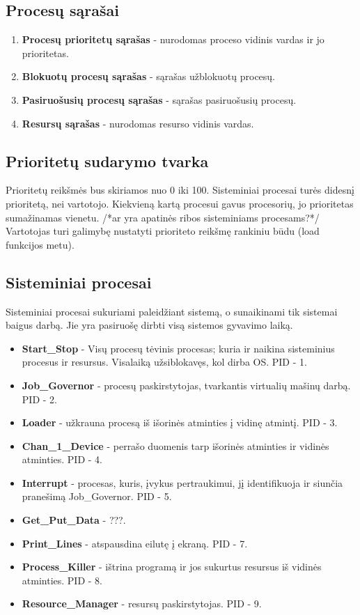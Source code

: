 	\subsection{Procesų sąrašai}
		\begin{enumerate}
			\item \textbf{Procesų prioritetų sąrašas} - nurodomas proceso vidinis vardas ir jo prioritetas.
			\item \textbf{Blokuotų procesų sąrašas} - sąrašas užblokuotų procesų.
			\item \textbf{Pasiruošusių procesų sąrašas} - sąrašas pasiruošusių procesų.
			\item  \textbf{Resursų sąrašas} - nurodomas resurso vidinis vardas.
		\end{enumerate}
	\subsection{Prioritetų sudarymo tvarka}
		Prioritetų reikšmės bus skiriamos nuo 0 iki 100. Sisteminiai procesai turės didesnį prioritetą, nei vartotojo. Kiekvieną kartą procesui gavus procesorių, jo prioritetas sumažinamas vienetu. /*ar yra apatinės ribos sisteminiams procesams?*/ Vartotojas turi galimybę nustatyti prioriteto reikšmę rankiniu būdu (load funkcijos metu).
	\subsection{Sisteminiai procesai}
		Sisteminiai procesai sukuriami paleidžiant sistemą, o sunaikinami tik sistemai baigus darbą. Jie yra pasiruošę dirbti visą sistemos gyvavimo laiką. 
		\begin{itemize}
			\item \textbf{Start\_Stop} - Visų procesų tėvinis procesas; kuria ir naikina sisteminius procesus ir resursus. Visalaiką užsiblokavęs, kol dirba OS. PID - 1.
			\item \textbf{Job\_Governor} - procesų paskirstytojas, tvarkantis virtualių mašinų darbą. PID - 2.
			\item \textbf{Loader} - užkrauna procesą iš išorinės atminties į vidinę atmintį. PID - 3.
			\item \textbf{Chan\_1\_Device} - perrašo duomenis tarp išorinės atminties ir vidinės atminties. PID - 4.
			\item \textbf{Interrupt} - procesas, kuris, įvykus pertraukimui, jį identifikuoja ir siunčia pranešimą Job\_Governor. PID - 5.
			\item \textbf{Get\_Put\_Data} - ???.
			\item \textbf{Print\_Lines} - atspausdina eilutę į ekraną. PID - 7.
			\item  \textbf{Process\_Killer} - ištrina programą ir jos sukurtus resursus iš vidinės atminties. PID - 8.
			\item \textbf{Resource\_Manager} - resursų paskirstytojas. PID - 9.
		\end{itemize}
